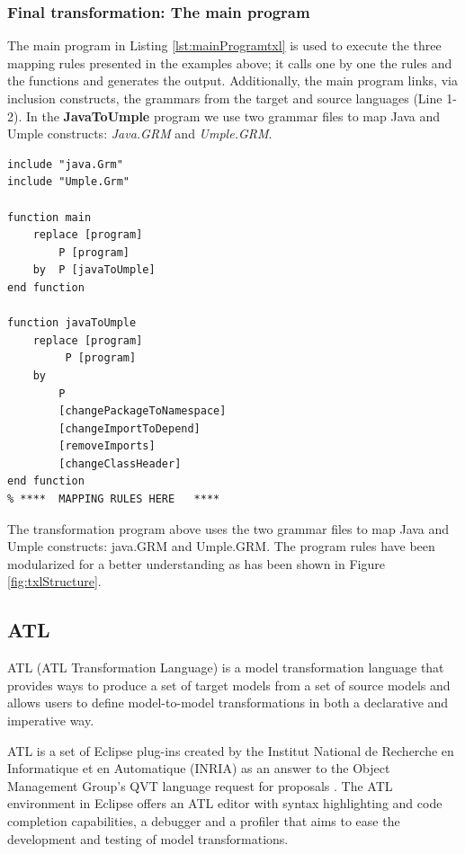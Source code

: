 \subsubsection{Final transformation: The main program}

The main program in Listing \ref{lst:mainProgramtxl} is used to execute the three mapping rules presented in the examples above; it calls one by one the rules and the functions and generates the output. Additionally, the main program links, via inclusion constructs, the grammars from the target and source languages (Line 1-2). In the \textbf{JavaToUmple} program we use two grammar files to map Java and Umple constructs: \textit{Java.GRM} and\textit{ Umple.GRM}.

\begin{lstlisting}[style=umplePlain, label=lst:mainProgramtxl, caption=The ATL main program - JavaToUmple.Txl] 
include "java.Grm" 
include "Umple.Grm" 

function main    
    replace [program]
        P [program]     
    by 	P [javaToUmple]
end function 

function javaToUmple   
    replace [program] 
         P [program]     
    by 
        P 
        [changePackageToNamespace] 
        [changeImportToDepend] 
        [removeImports] 
        [changeClassHeader]
end function 
% ****	MAPPING RULES HERE   ****
\end{lstlisting}

The transformation program above uses the two grammar files to map Java and Umple constructs:  java.GRM and Umple.GRM. The program rules have been modularized for a better understanding as has been shown in Figure \ref{fig:txlStructure}.

\subsection{ATL}

ATL (ATL Transformation Language) \cite{atl} is a model transformation language that provides ways to produce a set of target models from a set of source models and allows users to define model-to-model transformations in both a declarative and imperative way.

ATL is a set of Eclipse plug-ins created by the Institut National de Recherche en Informatique et en Automatique (INRIA) as an answer to the Object Management Group's QVT language request for proposals \cite{Jouault200831}.  The ATL environment in Eclipse offers an ATL editor with syntax highlighting and code completion capabilities, a debugger and a profiler that aims to ease the development and testing of model transformations.


